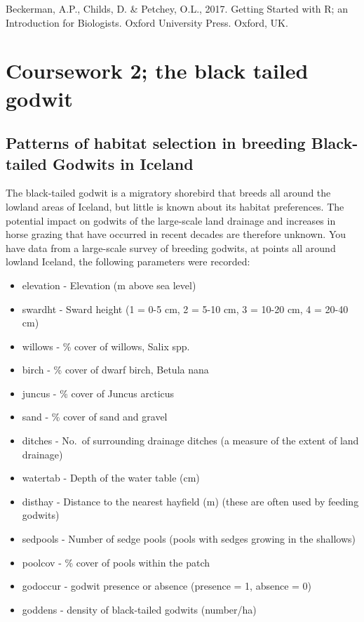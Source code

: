 \documentclass[
]{book}
\providecommand{\tightlist}{%
  \setlength{\itemsep}{0pt}\setlength{\parskip}{0pt}}
\begin{document}
Beckerman, A.P., Childs, D. \& Petchey, O.L., 2017. Getting Started with R; an Introduction for Biologists. Oxford University Press. Oxford, UK.

\chapter{Coursework 2; the black tailed godwit}\label{coursework-2-the-black-tailed-godwit}

\section{Patterns of habitat selection in breeding Black-tailed Godwits in Iceland}\label{patterns-of-habitat-selection-in-breeding-black-tailed-godwits-in-iceland}

The black-tailed godwit is a migratory shorebird that breeds all around the lowland areas of Iceland, but little is known about its habitat preferences. The potential impact on godwits of the large-scale land drainage and increases in horse grazing that have occurred in recent decades are therefore unknown. You have data from a large-scale survey of breeding godwits, at points all around lowland Iceland, the following parameters were recorded:

\begin{itemize}
\tightlist
\item
  elevation - Elevation (m above sea level)
\item
  swardht - Sward height (1 = 0-5 cm, 2 = 5-10 cm, 3 = 10-20 cm, 4 = 20-40 cm)
\item
  willows - \% cover of willows, Salix spp.
\item
  birch - \% cover of dwarf birch, Betula nana
\item
  juncus - \% cover of Juncus arcticus
\item
  sand - \% cover of sand and gravel
\item
  ditches - No.~of surrounding drainage ditches (a measure of the extent of land drainage)
\item
  watertab - Depth of the water table (cm)
\item
  disthay - Distance to the nearest hayfield (m) (these are often used by feeding godwits)
\item
  sedpools - Number of sedge pools (pools with sedges growing in the shallows)
\item
  poolcov - \% cover of pools within the patch
\item
  godoccur - godwit presence or absence (presence = 1, absence = 0)
\item
  goddens - density of black-tailed godwits (number/ha)
\end{itemize}
\end{document}
